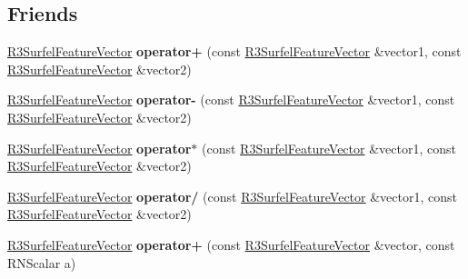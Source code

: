\subsection*{Friends}
\begin{DoxyCompactItemize}
\item 
\hyperlink{class_r3_surfel_feature_vector}{R3\+Surfel\+Feature\+Vector} {\bfseries operator+} (const \hyperlink{class_r3_surfel_feature_vector}{R3\+Surfel\+Feature\+Vector} \&vector1, const \hyperlink{class_r3_surfel_feature_vector}{R3\+Surfel\+Feature\+Vector} \&vector2)\hypertarget{class_r3_surfel_feature_vector_a0cf1b054f324fe1f9a9f0dc8aeec830f}{}\label{class_r3_surfel_feature_vector_a0cf1b054f324fe1f9a9f0dc8aeec830f}

\item 
\hyperlink{class_r3_surfel_feature_vector}{R3\+Surfel\+Feature\+Vector} {\bfseries operator-\/} (const \hyperlink{class_r3_surfel_feature_vector}{R3\+Surfel\+Feature\+Vector} \&vector1, const \hyperlink{class_r3_surfel_feature_vector}{R3\+Surfel\+Feature\+Vector} \&vector2)\hypertarget{class_r3_surfel_feature_vector_a2c354eb6a03230ff5f7274c505963bbd}{}\label{class_r3_surfel_feature_vector_a2c354eb6a03230ff5f7274c505963bbd}

\item 
\hyperlink{class_r3_surfel_feature_vector}{R3\+Surfel\+Feature\+Vector} {\bfseries operator$\ast$} (const \hyperlink{class_r3_surfel_feature_vector}{R3\+Surfel\+Feature\+Vector} \&vector1, const \hyperlink{class_r3_surfel_feature_vector}{R3\+Surfel\+Feature\+Vector} \&vector2)\hypertarget{class_r3_surfel_feature_vector_ae0ebc304f1a47dfd63fdec503d0c6604}{}\label{class_r3_surfel_feature_vector_ae0ebc304f1a47dfd63fdec503d0c6604}

\item 
\hyperlink{class_r3_surfel_feature_vector}{R3\+Surfel\+Feature\+Vector} {\bfseries operator/} (const \hyperlink{class_r3_surfel_feature_vector}{R3\+Surfel\+Feature\+Vector} \&vector1, const \hyperlink{class_r3_surfel_feature_vector}{R3\+Surfel\+Feature\+Vector} \&vector2)\hypertarget{class_r3_surfel_feature_vector_ab7449fb8279f4ee72fedd1264c6623c3}{}\label{class_r3_surfel_feature_vector_ab7449fb8279f4ee72fedd1264c6623c3}

\item 
\hyperlink{class_r3_surfel_feature_vector}{R3\+Surfel\+Feature\+Vector} {\bfseries operator+} (const \hyperlink{class_r3_surfel_feature_vector}{R3\+Surfel\+Feature\+Vector} \&vector, const R\+N\+Scalar a)\hypertarget{class_r3_surfel_feature_vector_a62f3b2563647daeb244a5fcd6a1517f3}{}\label{class_r3_surfel_feature_vector_a62f3b2563647daeb244a5fcd6a1517f3}


\end{DoxyCompactItemize}
